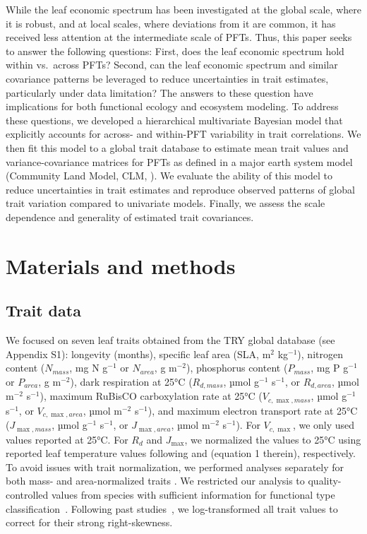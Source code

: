 \documentclass{article}
\begin{document}
While the leaf economic spectrum has been investigated at the global scale, where it is robust, and at local scales, where deviations from it are common, it has received less attention at the intermediate scale of PFTs.
Thus, this paper seeks to answer the following questions:
First, does the leaf economic spectrum hold within vs.\ across PFTs?
Second, can the leaf economic spectrum and similar covariance patterns be leveraged to reduce uncertainties in trait estimates, particularly under data limitation?
The answers to these question have implications for both functional ecology and ecosystem modeling.
To address these questions, we developed a hierarchical multivariate Bayesian model that explicitly accounts for across- and within-PFT variability in trait correlations.
We then fit this model to a global trait database to estimate mean trait values and variance-covariance matrices for PFTs as defined in a major earth system model (Community Land Model, CLM, \citealt{clm45_note}).
We evaluate the ability of this model to reduce uncertainties in trait estimates and reproduce observed patterns of global trait variation compared to univariate models.
Finally, we assess the scale dependence and generality of estimated trait covariances.


\section{Materials and methods}

\subsection{Trait data}

We focused on seven leaf traits obtained from the TRY global database \citep{kattge_2011_try} (see Appendix S1):
longevity (months),
specific leaf area (SLA, m$^2$ kg$^{-1}$),
nitrogen content ($N_{mass}$, mg N g$^{-1}$ or $N_{area}$, g m$^{-2}$),
phosphorus content ($P_{mass}$, mg P g$^{-1}$ or $P_{area}$, g m$^{-2}$),
dark respiration at 25°C ($R_{d,mass}$, µmol g$^{-1}$ s$^{-1}$, or $R_{d,area}$, µmol m$^{-2}$ s$^{-1}$),
maximum RuBisCO carboxylation rate at 25°C ($V_{c,\max,mass}$, µmol g$^{-1}$ s$^{-1}$, or $V_{c,\max,area}$, µmol m$^{-2}$ s$^{-1}$),
and maximum electron transport rate at 25°C ($J_{\max,mass}$, µmol g$^{-1}$ s$^{-1}$, or $J_{\max,area}$, µmol m$^{-2}$ s$^{-1}$).
For $V_{c,\max}$, we only used values reported at 25°C.
For $R_{d}$ and $J_{\max}$, we normalized the values to 25°C using reported leaf temperature values following \citet{atkin_2015_global} and \citet{kattge_2007_temperature} (equation 1 therein), respectively.
To avoid issues with trait normalization, we performed analyses separately for both mass- and area-normalized traits \citep{osnas_2013_global,lloyd_2013_photosynthetically}.
We restricted our analysis to quality-controlled values from species with sufficient information for functional type classification~\cite[see][]{kattge_2011_try}.
Following past studies~\cite[e.g.][]{wright_2004_worldwide,onoda_2011_global,diaz_2015_global}, we log-transformed all trait values to correct for their strong right-skewness.
\end{document}
